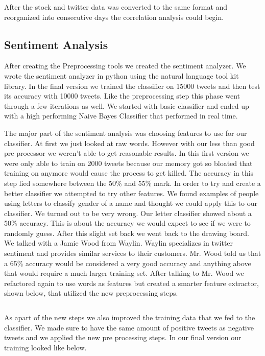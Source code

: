 \documentclass{acm_proc_article-sp}
\begin{document}
After the stock and twitter data was converted to the same format and
reorganized into consecutive days the correlation analysis could begin. 

\subsection{Sentiment Analysis}

After creating the Preprocessing tools we created the sentiment analyzer.  We
wrote the sentiment analyzer in python using the natural language tool kit
library. In the final version we trained the classifier on 15000 tweets and
then test its accuracy with 10000 tweets. Like the preprocessing step this
phase went through a few iterations as well. We started with basic classifier
and ended up with a high performing Naive Bayes Classifier that performed in
real time.

The major part of the sentiment analysis was choosing features to use for our
classifier. At first we just looked at raw words. However with our less than
good pre processor we weren't able to get reasonable results. In this first
version we were only able to train on 2000 tweets because our memory got so
bloated that training on anymore would cause the process to get killed. The
accuracy in this step lied somewhere between the 50\% and 55\% mark. In order
to try and create a better classifier we attempted to try other features. We
found examples of people using letters to classify gender of a name and thought
we could apply this to our classifier. We turned out to be very wrong. Our
letter classifier showed about a 50\% accuracy. This is about the accuracy we
would expect to see if we were to randomly guess. After this slight set back we
went back to the drawing board.  We talked with a Jamie Wood from Waylin.
Waylin specializes in twitter sentiment and provides similar services to their
customers. Mr. Wood told us that a 65\% accuracy would be considered a very good
accuracy and anything above that would require a much larger training set.
After talking to Mr. Wood we refactored again to use words as features but
created a smarter feature extractor, shown below, that utilized the new
preprocessing steps.

\inputminted{python}{examples/featureExtractor.py}

As apart of the new steps we also improved the training data that we fed to the
classifier.  We made sure to have the same amount of positive tweets as
negative tweets and we applied the new pre processing steps. In our final
version our training looked like below.
\end{document}
